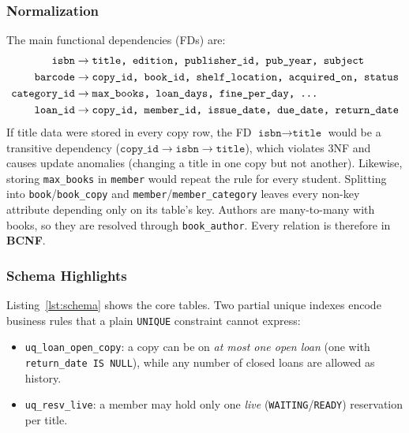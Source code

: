 \documentclass[11pt,a4paper]{report}
\begin{document}
\subsubsection{Normalization}
The main functional dependencies (FDs) are:
\begin{align*}
\texttt{isbn} &\rightarrow \texttt{title, edition, publisher\_id, pub\_year, subject}\\
\texttt{barcode} &\rightarrow \texttt{copy\_id, book\_id, shelf\_location, acquired\_on, status}\\
\texttt{category\_id} &\rightarrow \texttt{max\_books, loan\_days, fine\_per\_day, \dots}\\
\texttt{loan\_id} &\rightarrow \texttt{copy\_id, member\_id, issue\_date, due\_date, return\_date}
\end{align*}
If title data were stored in every copy row, the FD $\texttt{isbn} \rightarrow \texttt{title}$ would be a transitive dependency ($\texttt{copy\_id} \rightarrow \texttt{isbn} \rightarrow \texttt{title}$), which violates 3NF and causes update anomalies (changing a title in one copy but not another). Likewise, storing \texttt{max\_books} in \texttt{member} would repeat the rule for every student. Splitting into \texttt{book}/\texttt{book\_copy} and \texttt{member}/\texttt{member\_category} leaves every non-key attribute depending only on its table's key. Authors are many-to-many with books, so they are resolved through \texttt{book\_author}. Every relation is therefore in \textbf{BCNF}.

\subsubsection{Schema Highlights}
Listing~\ref{lst:schema} shows the core tables. Two partial unique indexes encode business rules that a plain \texttt{UNIQUE} constraint cannot express:
\begin{itemize}
    \item \texttt{uq\_loan\_open\_copy}: a copy can be on \emph{at most one open loan} (one with \texttt{return\_date IS NULL}), while any number of closed loans are allowed as history.
    \item \texttt{uq\_resv\_live}: a member may hold only one \emph{live} (\texttt{WAITING}/\texttt{READY}) reservation per title.
\end{itemize}
\end{document}
